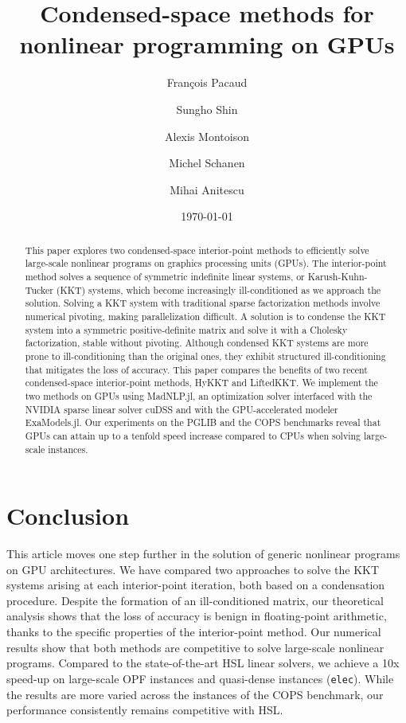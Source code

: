 \documentclass[smallextended]{svjour3}
\title{Condensed-space methods for nonlinear programming on GPUs}
\author{François Pacaud \and
Sungho Shin \and
Alexis Montoison \and
Michel Schanen \and
Mihai Anitescu
}
\date{\today}
\begin{document}
\maketitle

\begin{abstract}
  This paper explores two condensed-space interior-point methods to efficiently solve large-scale nonlinear programs on graphics processing units (GPUs). The interior-point method solves a sequence of symmetric indefinite linear systems, or Karush-Kuhn-Tucker (KKT) systems, which become increasingly ill-conditioned as we approach the solution. Solving a KKT system with traditional sparse factorization methods involve numerical pivoting, making parallelization difficult. A solution is to condense the KKT system into a symmetric positive-definite matrix and solve it with a Cholesky factorization, stable without pivoting. Although condensed KKT systems are more prone to ill-conditioning than the original ones, they exhibit structured ill-conditioning that mitigates the loss of accuracy. This paper compares the benefits of two recent condensed-space interior-point methods, HyKKT and LiftedKKT. We implement the two methods on GPUs using MadNLP.jl, an optimization solver interfaced with the NVIDIA sparse linear solver cuDSS and with the GPU-accelerated modeler ExaModels.jl. Our experiments on the PGLIB and the COPS benchmarks reveal that GPUs can attain up to a tenfold speed increase compared to CPUs when solving large-scale instances.
\end{abstract}









\section{Conclusion}
This article moves one step further in the solution of generic nonlinear
programs on GPU architectures. We have compared two approaches
to solve the KKT systems arising at each interior-point iteration, both
based on a condensation procedure.
Despite the formation of an ill-conditioned matrix, our theoretical analysis shows that the loss of accuracy is benign in floating-point arithmetic, thanks to the specific properties of the interior-point method.
Our numerical results show that both methods are competitive to solve large-scale
nonlinear programs.
Compared to the state-of-the-art HSL linear solvers, we achieve a 10x speed-up on large-scale OPF instances and quasi-dense instances (\texttt{elec}). While the results are more varied across the instances of the COPS benchmark, our performance consistently remains competitive with HSL.
\end{document}
